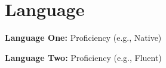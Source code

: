 \section{Language}
\begin{onecolentry}
    \textbf{Language One:} Proficiency (e.g., Native)
\end{onecolentry}


\begin{onecolentry}
    \textbf{Language Two:} Proficiency (e.g., Fluent)
\end{onecolentry}

\placelastupdatedtext
